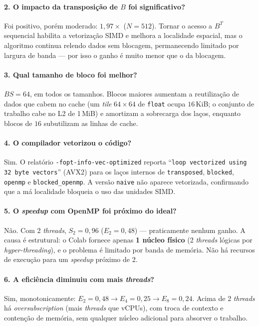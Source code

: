 \documentclass{sbc2023}%
\begin{document}
\paragraph{2. O impacto da transposição de $B$ foi significativo?}
Foi positivo, porém moderado: $1{,}97\times$ ($N=512$). Tornar o acesso a $B^{T}$ sequencial habilita a vetorização SIMD e melhora a localidade espacial, mas o algoritmo continua relendo dados sem blocagem, permanecendo limitado por largura de banda --- por isso o ganho é muito menor que o da blocagem.

\paragraph{3. Qual tamanho de bloco foi melhor?}
$BS=64$, em todos os tamanhos. Blocos maiores aumentam a reutilização de dados que cabem no cache (um \textit{tile} $64\times64$ de \texttt{float} ocupa $16$\,KiB; o conjunto de trabalho cabe no L2 de 1\,MiB) e amortizam a sobrecarga dos laços, enquanto blocos de $16$ subutilizam as linhas de cache.

\paragraph{4. O compilador vetorizou o código?}
Sim. O relatório \texttt{-fopt-info-vec-optimized} reporta ``\texttt{loop vectorized using 32 byte vectors}'' (AVX2) para os laços internos de \texttt{transposed}, \texttt{blocked}, \texttt{openmp} e \texttt{blocked\_openmp}. A versão \texttt{naive} não aparece vetorizada, confirmando que a má localidade bloqueia o uso das unidades SIMD.

\paragraph{5. O \textit{speedup} com OpenMP foi próximo do ideal?}
Não. Com 2 \textit{threads}, $S_2 = 0{,}96$ ($E_2 = 0{,}48$) --- praticamente nenhum ganho. A causa é estrutural: o Colab fornece apenas \textbf{1 núcleo físico} (2 \textit{threads} lógicas por \textit{hyper-threading}), e o problema é limitado por banda de memória. Não há recursos de execução para um \textit{speedup} próximo de 2.

\paragraph{6. A eficiência diminuiu com mais \textit{threads}?}
Sim, monotonicamente: $E_2 = 0{,}48 \to E_4 = 0{,}25 \to E_8 = 0{,}24$. Acima de 2 \textit{threads} há \textit{oversubscription} (mais \textit{threads} que vCPUs), com troca de contexto e contenção de memória, sem qualquer núcleo adicional para absorver o trabalho.
\end{document}
